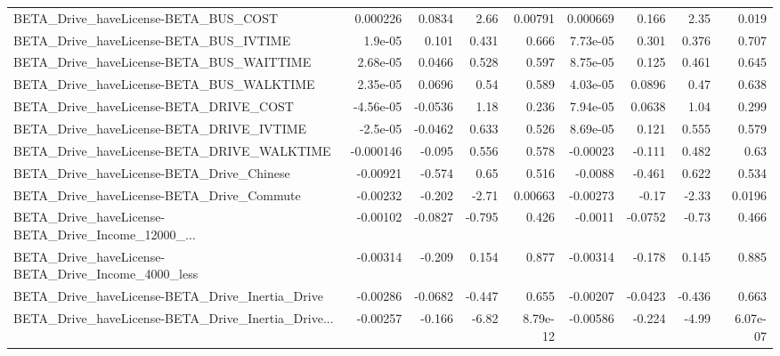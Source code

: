 \begin{tabular}{lrrrrrrrr}
BETA\_Drive\_haveLicense-BETA\_BUS\_COST               &    0.000226 &       0.0834 &     2.66 &  0.00791 &   0.000669 &       0.166 &         2.35 &         0.019 \\
BETA\_Drive\_haveLicense-BETA\_BUS\_IVTIME             &     1.9e-05 &        0.101 &    0.431 &    0.666 &   7.73e-05 &       0.301 &        0.376 &         0.707 \\
BETA\_Drive\_haveLicense-BETA\_BUS\_WAITTIME           &    2.68e-05 &       0.0466 &    0.528 &    0.597 &   8.75e-05 &       0.125 &        0.461 &         0.645 \\
BETA\_Drive\_haveLicense-BETA\_BUS\_WALKTIME           &    2.35e-05 &       0.0696 &     0.54 &    0.589 &   4.03e-05 &      0.0896 &         0.47 &         0.638 \\
BETA\_Drive\_haveLicense-BETA\_DRIVE\_COST             &   -4.56e-05 &      -0.0536 &     1.18 &    0.236 &   7.94e-05 &      0.0638 &         1.04 &         0.299 \\
BETA\_Drive\_haveLicense-BETA\_DRIVE\_IVTIME           &    -2.5e-05 &      -0.0462 &    0.633 &    0.526 &   8.69e-05 &       0.121 &        0.555 &         0.579 \\
BETA\_Drive\_haveLicense-BETA\_DRIVE\_WALKTIME         &   -0.000146 &       -0.095 &    0.556 &    0.578 &   -0.00023 &      -0.111 &        0.482 &          0.63 \\
BETA\_Drive\_haveLicense-BETA\_Drive\_Chinese          &    -0.00921 &       -0.574 &     0.65 &    0.516 &    -0.0088 &      -0.461 &        0.622 &         0.534 \\
BETA\_Drive\_haveLicense-BETA\_Drive\_Commute          &    -0.00232 &       -0.202 &    -2.71 &  0.00663 &   -0.00273 &       -0.17 &        -2.33 &        0.0196 \\
BETA\_Drive\_haveLicense-BETA\_Drive\_Income\_12000\_... &    -0.00102 &      -0.0827 &   -0.795 &    0.426 &    -0.0011 &     -0.0752 &        -0.73 &         0.466 \\
BETA\_Drive\_haveLicense-BETA\_Drive\_Income\_4000\_less &    -0.00314 &       -0.209 &    0.154 &    0.877 &   -0.00314 &      -0.178 &        0.145 &         0.885 \\
BETA\_Drive\_haveLicense-BETA\_Drive\_Inertia\_Drive    &    -0.00286 &      -0.0682 &   -0.447 &    0.655 &   -0.00207 &     -0.0423 &       -0.436 &         0.663 \\
BETA\_Drive\_haveLicense-BETA\_Drive\_Inertia\_Drive... &    -0.00257 &       -0.166 &    -6.82 & 8.79e-12 &   -0.00586 &      -0.224 &        -4.99 &      6.07e-07 \\

\end{tabular}
